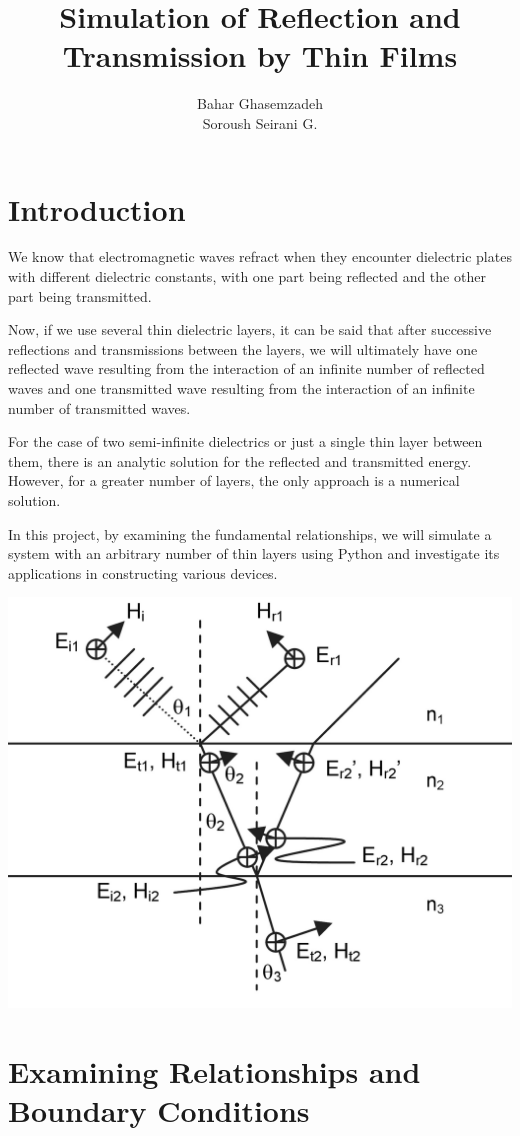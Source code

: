 \documentclass{article}
\title{
Simulation of Reflection and Transmission by Thin Films}
\author{Bahar Ghasemzadeh\\Soroush Seirani G.}
\date{}
\begin{document}
	\maketitle
	\newpage
	
	\section*{Introduction}

	We know that electromagnetic waves refract when they encounter dielectric plates with different dielectric constants, with one part being reflected and the other part being transmitted.

	Now, if we use several thin dielectric layers, it can be said that after successive reflections and transmissions between the layers, we will ultimately have one reflected wave resulting from the interaction of an infinite number of reflected waves and one transmitted wave resulting from the interaction of an infinite number of transmitted waves.

	For the case of two semi-infinite dielectrics or just a single thin layer between them, there is an analytic solution for the reflected and transmitted energy. However, for a greater number of layers, the only approach is a numerical solution.

	In this project, by examining the fundamental relationships, we will simulate a system with an arbitrary number of thin layers using Python and investigate its applications in constructing various devices.
	
	\newpage
	
	
	\begin{center}
		\includegraphics[height=.45\linewidth]{image2}
	\end{center}
	
	\section*{Examining Relationships and Boundary Conditions}
	
\end{document}
